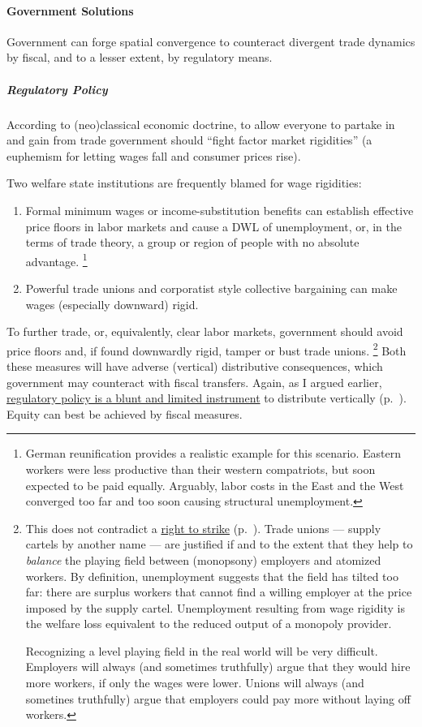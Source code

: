 \paragraph{Government Solutions} Government can forge spatial convergence to counteract divergent trade dynamics by fiscal, and to a lesser extent, by regulatory means.

\subparagraph{Regulatory Policy} According to (neo)classical economic doctrine, to allow everyone to partake in and gain from trade government should ``fight factor market rigidities'' (a euphemism for letting wages fall and consumer prices rise).

Two welfare state institutions are frequently blamed for wage rigidities:
\begin{enumerate}
	\item Formal minimum wages or income-substitution benefits can establish effective price floors in labor markets and cause a \gls{DWL} of unemployment, or, in the terms of trade theory, a group or region of people with no absolute advantage.
	\footnote{
		German reunification provides a realistic example for this scenario.
		Eastern workers were less productive than their western compatriots, but soon expected to be paid equally.
		Arguably, labor costs in the East and the West converged too far and too soon causing structural unemployment.
	}
	\item Powerful trade unions and corporatist style collective bargaining can make wages (especially downward) rigid.
\end{enumerate}

To further trade, or, equivalently, clear labor markets, government should avoid price floors and, if found downwardly rigid, tamper or bust trade unions.
\footnote{
	This does not contradict a \hyperref[sec:redistributive-policy]{right to strike} (p.~\pageref{sec:redistributive-policy}).
	Trade unions --- supply cartels by another name --- are justified if and to the extent that they help to \emph{balance} the playing field between (monopsony) employers and atomized workers.
	By definition, unemployment suggests that the field has tilted too far:
	there are surplus workers that cannot find a willing employer at the price imposed by the supply cartel.
	Unemployment resulting from wage rigidity is the welfare loss equivalent to the reduced output of a monopoly provider.

	Recognizing a level playing field in the real world will be very difficult.
	Employers will always (and sometimes truthfully) argue that they would hire more workers, if only the wages were lower.
	Unions will always (and sometines truthfully) argue that employers could pay more without laying off workers.
}
Both these measures will have adverse (vertical) distributive consequences, which government may counteract with fiscal transfers.
Again, as I argued earlier, \hyperref[sec:redistributive-policy]{regulatory policy is a blunt and limited instrument} to distribute vertically (p.~\pageref{sec:redistributive-policy}).
Equity can best be achieved by fiscal measures.

